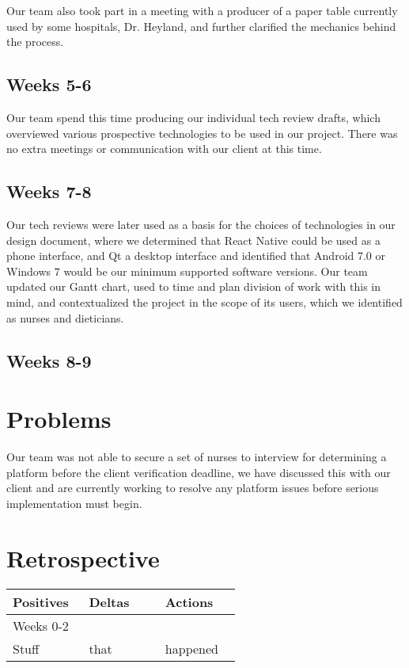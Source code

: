 \documentclass[onecolumn, draftclsnofoot,10pt, compsoc]{IEEEtran}
\begin{document}
Our team also took part in a meeting with a producer of a paper table currently used by some hospitals, Dr. Heyland, and further clarified the mechanics behind the process.
\subsection{Weeks 5-6}
Our team spend this time producing our individual tech review drafts, which overviewed various prospective technologies to be used in our project.
There was no extra meetings or communication with our client at this time.

\subsection{Weeks 7-8}
Our tech reviews were later used as a basis for the choices of technologies in our design document, where we determined that React Native could be used as a phone interface, and Qt a desktop interface and identified that Android 7.0 or Windows 7 would be our minimum supported software versions.
Our team updated our Gantt chart, used to time and plan division of work with this in mind, and contextualized the project in the scope of its users, which we identified as nurses and dieticians.

\subsection{Weeks 8-9}
\section{Problems}
Our team was not able to secure a set of nurses to interview for determining a platform before the client verification deadline, we have discussed this with our client and are currently working to resolve any platform issues before serious implementation must begin.
\section{Retrospective}
\begin{tabular}{p{0.3\linewidth} p{0.3\linewidth} p{0.3\linewidth}}
\large{Positives} & \large{Deltas} & \large{Actions}\\
\hline
Weeks 0-2 & \nobreakspace & \nobreakspace\\
\hline
Stuff & that & happened\\
\hline


\end{tabular}
\end{document}

